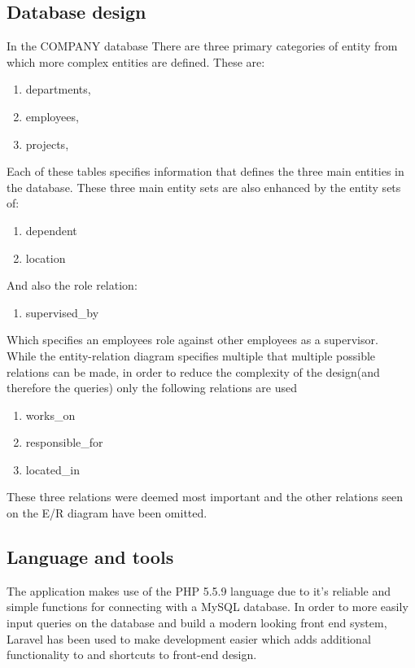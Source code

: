 \documentclass[11pt,letterpaper]{article}
\begin{document}
\subsection{Database design}
In the COMPANY database There are three primary categories of entity from which more complex entities are defined. These are:
\begin{enumerate}[]
	\item departments, 
	\item employees,
	\item projects,
\end{enumerate}
Each of these tables specifies information that defines the three main entities in the database. These three main entity sets are also enhanced by the entity sets of:
\begin{enumerate}[]
	\item dependent 
	\item location	
\end{enumerate}	
And also the role relation:
\begin{enumerate}[]	
	\item supervised\_by 	
\end{enumerate}
Which specifies an employees role against other employees as a supervisor.\\
While the entity-relation diagram specifies multiple that multiple possible relations can be made, in order to reduce the complexity of the design(and therefore the queries) only the following relations are used
\begin{enumerate}[]
	\item works\_on
	\item responsible\_for
	\item located\_in
\end{enumerate}
These three relations were deemed most important and the other relations seen on the E/R diagram have been omitted.

\subsection{Language and tools}
	The application makes use of the PHP 5.5.9 language due to it's reliable and simple functions for connecting with a MySQL database. In order to more easily input queries on the database and build a modern looking front end system, Laravel has been used to make development easier which adds additional functionality to and shortcuts to front-end design.\\
\end{document}
